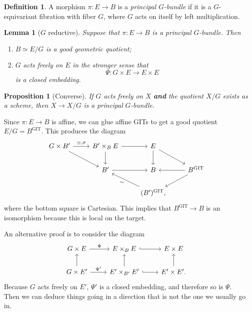 \documentclass{amsart}
\newtheorem{prop}[thm]{Proposition}
\newtheorem{lem}[thm]{Lemma}
\theoremstyle{definition}
\newtheorem{defn}[thm]{Definition}
\theoremstyle{remark}
\theoremstyle{plain}
\theoremstyle{definition}
\theoremstyle{remark}
\newcommand{\mr}[1]{\mathrm{#1}}
\newcommand{\1}{\mathbf{1}}
\newcommand{\2}{\mathbf{2}}
\newcommand{\3}{\mathbf{3}}
\begin{document}
\begin{defn}
    A morphism \(\pi \colon E \to B\) is a \textit{principal \(G\)-bundle} if it is a \(G\)-equivariant fibration with fiber \(G\), where \(G\) acts on itself by left multiplication.
\end{defn}

\begin{lem}[\(G\) reductive]
    Suppose that \(\pi \colon E \to B\) is a principal \(G\)-bundle. Then
    \begin{enumerate}
        \item \(B \simeq E / G\) is a good geometric quotient;
        \item \(G\) acts freely on \(E\) in the stronger sense that
        \[ \Psi \colon G \times E \to E \times E \]
        is a closed embedding.
    \end{enumerate}
\end{lem}

\begin{prop}[Converse]
    If \(G\) acts freely on \(X\) \textbf{and} the quotient \(X/G\) exists as a scheme, then \(X \to X/G\) is a principal \(G\)-bundle.
\end{prop}

Since \(\pi \colon E \to B\) is affine, we can glue affine GITs to get a good quotient \(E / G = B^{\mr{GIT}}\). This produces the diagram
\begin{equation*}
\begin{tikzcd}
    G \times B' \ar{r}{\simeq, \sigma} \ar{dr} & B' \times_B E \ar{r} \ar{d} & E \ar{d} \ar{dr} \\
    & B' \ar{r} & B & B^{\mr{GIT}} \ar{l} \ar{dl} \\
    & & (B')^{\mr{GIT}} \ar{ul}{\sim},
\end{tikzcd}
\end{equation*}
where the bottom square is Cartesian. This implies that \(B^{\mr{GIT}} \to B\) is an isomorphism because this is local on the target.

An alternative proof is to consider the diagram
\begin{equation*}
\begin{tikzcd}
    G \times E \ar{r}{\Psi} & E \times_B E \ar[hookrightarrow]{r} & E \times E \\
    G \times E' \ar{u} \ar{r}{\Psi'} & E' \times_{B'} E' \ar{u} \ar[hookrightarrow]{r} & E' \times E' \ar{u}.
\end{tikzcd}
\end{equation*}
Because \(G\) acts freely on \(E'\), \(\Psi'\) is a closed embedding, and therefore so is \(\Psi\). Then we can deduce things going in a direction that is not the one we usually go in.
\end{document}

